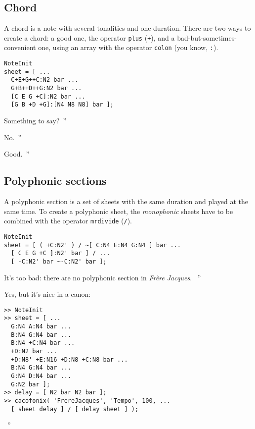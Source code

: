 \documentclass{article}
\newcommand{\frerejaques}{\emph{Fr\`ere Jacques}\xspace}
\newenvironment{meenv}{ \par \noindent \makebox[6em][r]{ \textcolor{mecolor}{Me}: `` --~}}{~''}
\newenvironment{myselfenv}{ \par \noindent \makebox[6em][r]{ \textcolor{myselfcolor}{Myself}: `` --~}}{~''}
\newcommand{\me}[1]{\begin{meenv}#1\end{meenv}}
\newcommand{\myself}[1]{\begin{myselfenv}#1\end{myselfenv}}
\begin{document}
\subsection{Chord}

A chord is a note with several tonalities and one duration. There are two ways to create a chord: a good one, the operator \lstinline!plus! (\lstinline!+!), and a bad-but-sometimes-convenient one, using an array with the operator \lstinline!colon! (you know, \lstinline!:!). \\

\begin{lstlisting}
NoteInit
sheet = [ ...
  C+E+G++C:N2 bar ...
  G+B++D++G:N2 bar ...
  [C E G +C]:N2 bar ...
  [G B +D +G]:[N4 N8 N8] bar ];
\end{lstlisting}

\myself{Something to say?}
\me{No.}
\myself{Good.}

\subsection{Polyphonic sections}
\label{sec:TutoPolyphonic}

A polyphonic section is a set of sheets with the same duration and played at the same time. To create a polyphonic sheet, the \emph{monophonic} sheets have to be combined with the operator \lstinline!mrdivide! (\lstinline!/!). \\
\begin{lstlisting}
NoteInit
sheet = [ ( +C:N2' ) / ~[ C:N4 E:N4 G:N4 ] bar ...
  [ C E G +C ]:N2' bar ] / ...
  [ -C:N2' bar ~-C:N2' bar ];
\end{lstlisting}

\begin{meenv}%
It's too bad: there are no polyphonic section in \frerejaques.%
\end{meenv}
\begin{myselfenv}%
Yes, but it's nice in a canon:

\begin{lstlisting}
>> NoteInit
>> sheet = [ ...
  G:N4 A:N4 bar ...
  B:N4 G:N4 bar ...
  B:N4 +C:N4 bar ...
  +D:N2 bar ...
  +D:N8' +E:N16 +D:N8 +C:N8 bar ...
  B:N4 G:N4 bar ...
  G:N4 D:N4 bar ...
  G:N2 bar ];
>> delay = [ N2 bar N2 bar ];
>> cacofonix( 'FrereJacques', 'Tempo', 100, ...
  [ sheet delay ] / [ delay sheet ] );
\end{lstlisting}%
\end{myselfenv}
\end{document}
